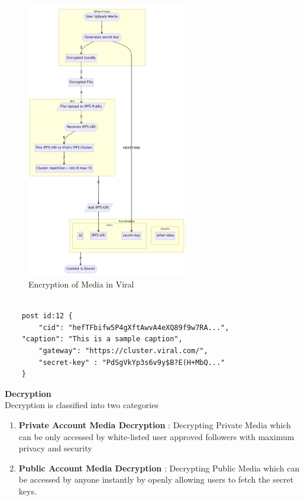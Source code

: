 \documentclass[conference]{IEEEtran}
\begin{document}
\begin{figure}[H]
\begin{center}
\includegraphics[width=7cm]{encryption}
\caption{Encryption of Media in Viral}
\end{center}
\end{figure}

\begin{lstlisting}[caption={Post Meta-Data}, numbers=none]

	post id:12 {
    	"cid": "hefTFbifw5P4gXftAwvA4eXQ89f9w7RA...",
    "caption": "This is a sample caption",
    	"gateway": "https://cluster.viral.com/",
    	"secret-key" : "PdSgVkYp3s6v9y$B?E(H+MbQ..."
	}
\end{lstlisting}

\textbf{Decryption}\\

Decryption is classified into two categories
\begin{enumerate}[wide, labelwidth=!, labelindent=0pt]
\item \textbf{Private Account Media Decryption} : Decrypting Private Media which can be only accessed by white-listed user approved followers with maximum privacy and security
\item \textbf{Public Account Media Decryption} : Decrypting Public Media which can be accessed by anyone instantly by openly allowing users to fetch the secret keys.
\end{enumerate}
\end{document}
